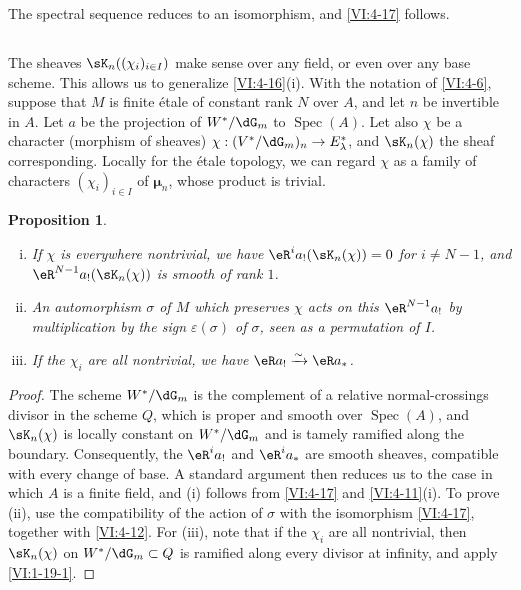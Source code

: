 \documentclass[oneside]{book}
\DeclareMathOperator{\spec}{Spec}
\newcommand{\dmu}{{\bm\mu}}
\newcounter{char}
\newcommand{\iso}{\xrightarrow\sim}
\theoremstyle{sga-source}
\theoremstyle{sga-source-dash}
\theoremstyle{sga-source-dotdash}
\theoremstyle{sga-source-number-note-dash}
\theoremstyle{sga-source-note-number-dotdash}
\theoremstyle{sga-source-example-dotdash}
\theoremstyle{sga-source-inline-number}
\theoremstyle{sga-source-bare-number}
\theoremstyle{sga-source}
\newtheorem{proposition_}[subsection]{Proposition}
\newcommand{\PrintPage}[1]{}\newcommand{\MathPage}[1]{}\newcommand{\PrintCite}[2]{#1}\newcommand{\var}[3]{#1}
\begin{document}
The spectral sequence reduces to an isomorphism, and \ref{VI:4-17} follows. 





\subsection{}\label{VI:4-19}

The sheaves $\sK_n((\chi_i)_{i\in I})$ make sense over any field, 
or even over any base scheme. This allows us to generalize 
\ref{VI:4-16}(i). With the notation of \ref{VI:4-6}, suppose that $M$ is finite 
étale of constant rank $N$ over $A$, and let $n$ be invertible in $A$. 
Let $a$ be the projection of $W^\ast/\dG_m$ to $\spec(A)$. Let also $\chi$ be 
a character (morphism of sheaves) 
$\chi:(V^\ast/\dG_m)_n \to E_\lambda^\ast$, and $\sK_n(\chi)$ the sheaf 
corresponding. Locally for the étale topology, we can regard $\chi$ 
as a family of characters $(\chi_i)_{i\in I}$ of $\dmu_n$, whose product is 
trivial.

\begin{proposition_}\label{VI:4-20}
\begin{enumerate}[(i)]
  \item If $\chi$ is everywhere nontrivial, we have 
    $\eR^i a_! (\sK_n(\chi)) = 0$ for $i\ne \var{N-1}{N-2}{S45-SOL-0856}$, and 
    $\eR^{\var{N-1}{N-2}{S45-SOL-0856}} a_!(\sK_n(\chi))$ is smooth of rank $1$. 
  \item An automorphism $\sigma$ of $M$ which preserves $\chi$ acts on this 
    $\eR^{\var{N-1}{N-2}{S45-SOL-0856}} a_!$ by multiplication by the sign $\varepsilon(\sigma)$ 
    of $\sigma$, seen as a permutation of $I$. 
  \item If the $\chi_i$ are all nontrivial, we have $\eR a_! \iso \eR a_\ast$. 
\end{enumerate}
\end{proposition_}
\begin{proof}[Proof]
The scheme $W^\ast/\dG_m$ is the complement of a relative normal-crossings 
divisor in the scheme $Q$, which is proper and smooth over $\spec(A)$, and 
$\sK_n(\chi)$ is \PrintPage{207}
locally constant on $W^\ast/\dG_m$ and is tamely ramified 
along the boundary. Consequently, the $\eR^i a_!$ and 
$\eR^i a_\ast$ are smooth sheaves, compatible with every change of 
base. A standard argument then reduces us to the case in which $A$ is a 
finite field, and (i) follows from \ref{VI:4-17} and \ref{VI:4-11}(i). 
To prove (ii), use the compatibility of the action of $\sigma$ with 
the isomorphism \ref{VI:4-17}, together with \ref{VI:4-12}. For (iii), note that if the 
$\chi_i$ are all nontrivial, then $\sK_n(\chi)$ on 
$W^\ast/\dG_m\subset Q$ is ramified along every divisor at infinity, 
and apply \ref{VI:1-19-1}. 
\end{proof}
\end{document}
